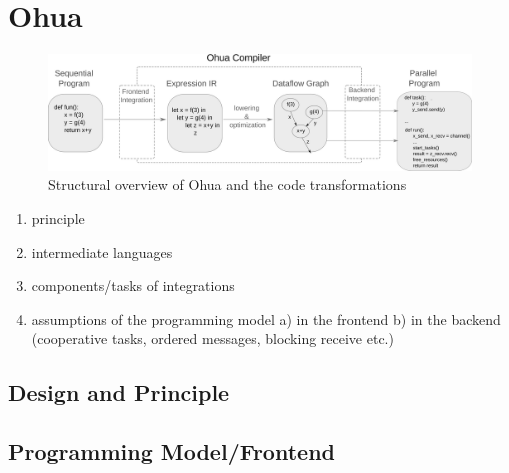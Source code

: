 \section{Ohua}
\label{sec:back_ohua}

\begin{figure}[H]
    \centering
    \includegraphics[scale= 0.36]{figures/ohua_fine_with_channels.png}
    \caption{Structural overview of Ohua and the code transformations}
    \label{fig:ohua_fine}
\end{figure}

\begin{enumerate}
    \item principle
    \item intermediate languages
    \item components/tasks of integrations
    \item assumptions of the programming model a) in the frontend b) in the backend (cooperative tasks, ordered messages, blocking receive etc.) 
\end{enumerate}

\subsection{Design and Principle}
\subsection{Programming Model/Frontend}
